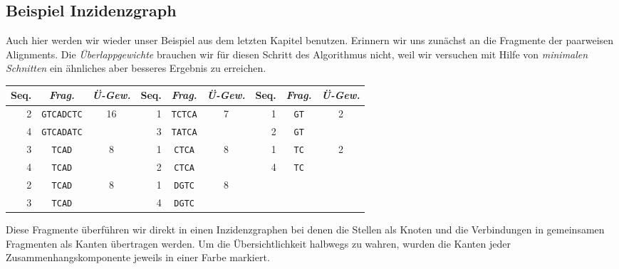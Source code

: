 \subsection{Beispiel Inzidenzgraph}

Auch hier werden wir wieder unser Beispiel aus dem letzten Kapitel benutzen. Erinnern wir uns zunächst an die Fragmente der paarweisen Alignments. Die \emph{Überlappgewichte} brauchen wir für diesen Schritt des Algorithmus nicht, weil wir versuchen mit Hilfe von \emph{minimalen Schnitten} ein ähnliches aber besseres Ergebnis zu erreichen.

\begin{tabular}{r|c|c||r|c|c||r|c|c}
	Seq. & \emph{Frag.} & \emph{Ü-Gew.} & Seq. & \emph{Frag.} & \emph{Ü-Gew.} & Seq. & \emph{Frag.} & \emph{Ü-Gew.}\\
	\hline
	2 & \texttt{GTCADCTC} & \multirow{2}{*}{16} & 1 & \texttt{TCTCA} & \multirow{2}{*}{7} & 1 & \texttt{GT} &\multirow{2}{*}{2} \\
	4 & \texttt{GTCADATC} &                     & 3 & \texttt{TATCA} &                     & 2 & \texttt{GT} & \\
	3 & \texttt{TCAD} & \multirow{2}{*}{8} & 1 & \texttt{CTCA} & \multirow{2}{*}{8} & 1 & \texttt{TC} & \multirow{2}{*}{2} \\
	4 & \texttt{TCAD} &                     & 2 & \texttt{CTCA} &                          & 4 & \texttt{TC} & \\
	2 & \texttt{TCAD} & \multirow{2}{*}{8} & 1 & \texttt{DGTC} & \multirow{2}{*}{8} &    &   & \\
	3 & \texttt{TCAD} &                     & 4 & \texttt{DGTC} &                     &    &   & \\
\end{tabular}

Diese Fragmente überführen wir direkt in einen Inzidenzgraphen bei denen die Stellen als Knoten und die Verbindungen in gemeinsamen Fragmenten als Kanten übertragen werden. Um die Übersichtlichkeit halbwegs zu wahren, wurden die Kanten jeder Zusammenhangskomponente jeweils in einer Farbe markiert.

